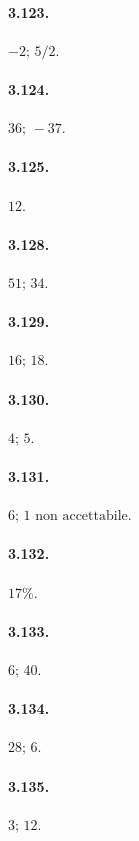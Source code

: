 \begin{multicols}{3}

\paragraph{3.123.}$ -2;\, 5/2 $.

\paragraph{3.124.}$ 36;\, -37 $.

\paragraph{3.125.}$12$.

\paragraph{3.128.}$ 51;\, 34 $.

\paragraph{3.129.}$16;\, 18$.

\paragraph{3.130.}$4;\, 5$.

\paragraph{3.131.}$6;\, 1\text{ non accettabile}$.

\paragraph{3.132.}$17\%$.

\paragraph{3.133.}$ 6;\, 40 $.

\paragraph{3.134.}$ 28;\, 6 $.

\paragraph{3.135.}$3;\, 12$.


\end{multicols}
